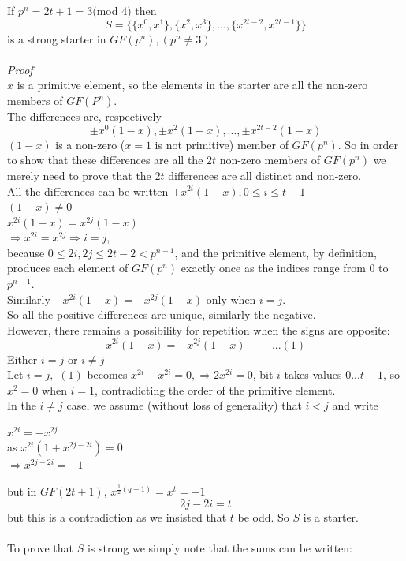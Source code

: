 \documentclass[
  12pt,
  a4paper]{book}
\begin{document}
If \(p^n=2t+1=3(\)mod \(4)\) then
\[S=\{\{x^0,x^1\},\{x^2,x^3\},...,\{x^{2t-2},x^{2t-1}\}\}\] is a strong
starter in \(GF(p^n),(p^n \neq 3)\)\\
~\\
\emph{Proof}\\
\(x\) is a primitive element, so the elements in the starter are all the
non-zero members of \(GF(P^n)\).\\
The differences are, respectively
\[\pm x^0(1-x), \pm x^2 (1-x), ... , \pm x^{2t-2}(1-x)\] \((1-x)\) is a
non-zero (\(x=1\) is not primitive) member of \(GF(p^n)\). So in order to
show that these differences are all the \(2t\) non-zero members of
\(GF(p^n)\) we merely need to prove that the \(2t\) differences are all
distinct and non-zero.\\
All the differences can be written \(\pm x^{2i}(1-x), 0 \leq i \leq t-1\)\\
\((1-x) \neq 0\)\\
\(x^{2i}(1-x)=x^{2j}(1-x)\)\\
\(\Rightarrow x^{2i}=x^{2j} \Rightarrow i=j\),\\
because \(0 \leq 2i,2j \leq 2t-2 < p^{n-1}\), and the primitive element,
by definition, produces each element of \(GF(p^n)\) exactly once as the
indices range from 0 to \(p^{n-1}\).\\
Similarly \(-x^{2i}(1-x)=-x^{2j}(1-x)\) only when \(i=j\).\\
So all the positive differences are unique, similarly the negative.\\
However, there remains a possibility for repetition when the signs are
opposite: \[x^{2i}(1-x)=-x^{2j}(1-x) \hspace{1cm}...(1)\] Either \(i=j\)
or \(i \neq j\)\\
Let \(i=j,\) \((1)\) becomes \(x^{2i}+x^{2i}=0, \Rightarrow 2x^{2i}=0\), bit
\(i\) takes values \(0...t-1\), so \(x^2=0\) when \(i=1\), contradicting the
order of the primitive element.\\
In the \(i \neq j\) case, we assume (without loss of generality) that
\(i<j\) and write

\(x^{2i} = -x^{2j}\)\\
as \(x^{2i}(1+x^{2j-2i})=0\)\\
\(\Rightarrow x^{2j-2i}=-1\)

but in \(GF(2t+1)\), \(x^{\frac{1}{2}(q-1)}=x^t=-1\) \[2j-2i=t\] but this is
a contradiction as we insisted that \(t\) be odd. So \(S\) is a starter.\\
~\\
To prove that \(S\) is strong we simply note that the sums can be written:
\end{document}
